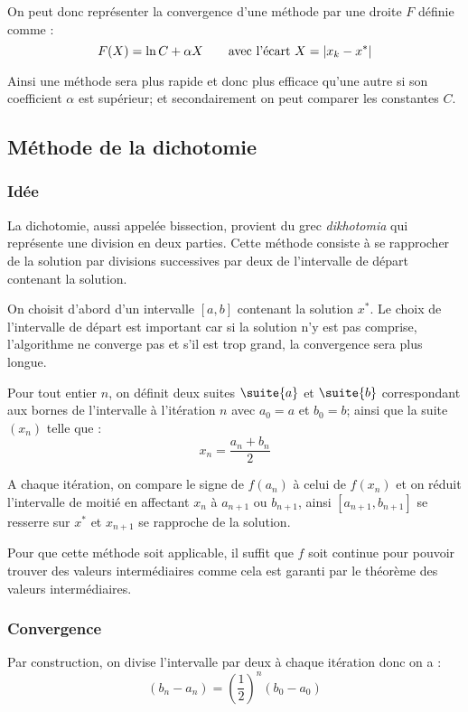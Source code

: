 		On peut donc représenter la convergence d'une méthode par une droite $F$ définie comme :
		\begin{equation}
			\label{eq-1-convLin}
			F(X) = \ln C + \alpha X \qquad \text{avec l'écart } X = \lvert x_k - x^* \rvert
		\end{equation}

		Ainsi une méthode sera plus rapide et donc plus efficace qu'une autre si son coefficient $\alpha$ est supérieur; et secondairement on peut comparer les constantes $C$.



	\subsection{Méthode de la dichotomie}
		
		\subsubsection{Idée}
			La dichotomie, aussi appelée bissection, provient du grec \textit{dikhotomia} qui représente une division en deux parties. Cette méthode consiste à se rapprocher de la solution par divisions successives par deux de l'intervalle de départ contenant la solution.

			On choisit d'abord d'un intervalle $[a,b]$ contenant la solution $x^*$. 
			Le choix de l'intervalle de départ est important car si la solution n'y est pas comprise, l'algorithme ne converge pas et s'il est trop grand, la convergence sera plus longue.
			
			Pour tout entier $n$, on définit deux suites $\suite{a}$ et $\suite{b}$ correspondant aux bornes de l'intervalle à l'itération $n$ avec $a_0 = a$ et $b_0 = b$; ainsi que la suite $(x_n)$ telle que :
			$$ x_n = \frac{a_n + b_n}{2} $$
			
			A chaque itération, on compare le signe de $f(a_n)$ à celui de $f(x_n)$ et on réduit l'intervalle de moitié en affectant $x_n$ à $a_{n+1}$ ou $b_{n+1}$, ainsi $[a_{n+1}, b_{n+1}]$ se resserre sur $x^*$ et $x_{n+1}$ se rapproche de la solution.

			Pour que cette méthode soit applicable, il suffit que $f$ soit continue pour pouvoir trouver des valeurs intermédiaires comme cela est garanti par le théorème des valeurs intermédiaires.


		\subsubsection{Convergence}
			Par construction, on divise l'intervalle par deux à chaque itération donc on a :
			$$	(b_n - a_n) =  \left(\frac{1}{2}\right)^n (b_0 - a_0)	$$

